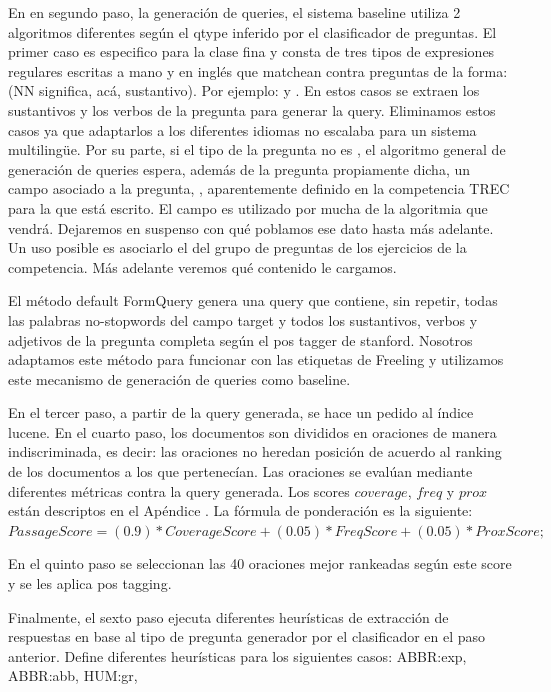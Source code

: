 En en segundo paso, la generación de queries, el sistema baseline utiliza 2 algoritmos diferentes según el qtype inferido por el clasificador de preguntas. El primer caso es especifico para la clase fina  y consta de tres tipos de expresiones regulares escritas a mano y en inglés que matchean contra preguntas de la forma:  (NN significa, acá, sustantivo). Por ejemplo:  y . En estos casos se extraen los sustantivos y los verbos de la pregunta para generar la query. Eliminamos estos casos ya que adaptarlos a los diferentes idiomas no escalaba para un sistema multilingüe. Por su parte, si el tipo de la pregunta no es , el algoritmo general de generación de queries espera, además de la pregunta propiamente dicha, un campo asociado a la pregunta, , aparentemente definido en la competencia TREC para la que está escrito. El campo  es utilizado por mucha de la algoritmia que vendrá. Dejaremos en suspenso con qué poblamos ese dato hasta más adelante. Un uso posible es asociarlo el  del grupo de preguntas de los ejercicios de la competencia. Más adelante veremos qué contenido le cargamos.


El método default FormQuery genera una query que contiene, sin repetir, todas las palabras no-stopwords del campo target y todos los sustantivos, verbos y adjetivos de la pregunta completa según el pos tagger de stanford. Nosotros adaptamos este método para funcionar con las etiquetas de Freeling y utilizamos este mecanismo de generación de queries como baseline.

En el tercer paso, a partir de la query generada, se hace un pedido al índice lucene. En el cuarto paso, los documentos son divididos en oraciones de manera indiscriminada, es decir: las oraciones no heredan posición de acuerdo al ranking de los documentos a los que pertenecían. Las oraciones se evalúan mediante diferentes métricas contra la query generada. Los scores $coverage$, $freq$ y $prox$ están descriptos en el Apéndice . La fórmula de ponderación es la siguiente: \\

$PassageScore = (0.9)*CoverageScore + (0.05)*FreqScore+ (0.05)*ProxScore;$

\medskip

En el quinto paso se seleccionan las 40 oraciones mejor rankeadas según este score y se les aplica pos tagging.

Finalmente, el sexto paso ejecuta diferentes heurísticas de extracción de respuestas en base al tipo de pregunta generador por el clasificador en el paso anterior.
Define diferentes heurísticas para los siguientes casos: ABBR:exp, ABBR:abb, HUM:gr,\newline

